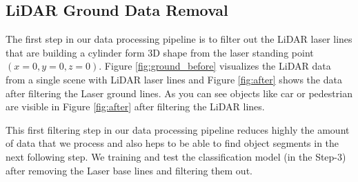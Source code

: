 % 
% 
% 







\subsection{LiDAR Ground Data Removal}
% 

The first step in our data processing pipeline is to filter out the LiDAR laser lines that are building a cylinder form 3D shape from the laser standing point $(x=0, y=0, z=0)$. Figure \ref{fig:ground_before} visualizes the LiDAR data from a single scene with LiDAR laser lines and Figure \ref{fig:after} shows the data after filtering the Laser ground lines. As you can see objects like car or pedestrian are visible in Figure \ref{fig:after} after filtering the LiDAR lines.

This first filtering step in our data processing pipeline reduces highly the amount of data that we process and also heps to be able to find object segments in the next following step. 
We training and test the classification model (in the Step-3) after removing the Laser base lines and filtering them out.  


